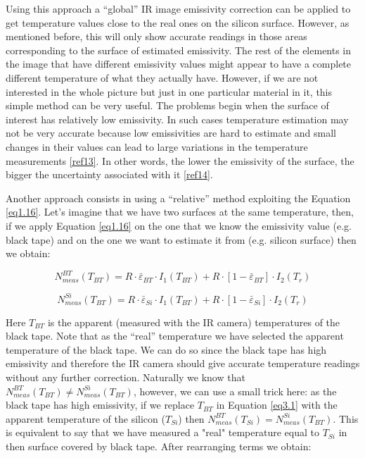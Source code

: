 		Using this approach a “global” IR image emissivity correction can be applied to get temperature values close to the real ones on the silicon surface. However, as mentioned before, this will only show accurate readings in those areas corresponding to the surface of estimated emissivity. The rest of the elements in the image that have different emissivity values might appear to have a complete different temperature of what they actually have. However, if we are not interested in the whole picture but just in one particular material in it, this simple method can be very useful. The problems begin when the surface of interest has relatively low emissivity. In such cases temperature estimation may not be very accurate because low emissivities are hard to estimate and small changes in their values can lead to large variations in the temperature measurements \ref{ref13}. In other words, the lower the emissivity of the surface, the bigger the uncertainty associated with it \ref{ref14}.
		
		Another approach consists in using a “relative” method exploiting the Equation \ref{eq1.16}. Let's imagine that we have two surfaces at the same temperature, then, if we apply Equation \ref{eq1.16} on the one that we know the emissivity value (e.g. black tape) and on the one we want to estimate it from (e.g. silicon surface) then we obtain:
		
		\begin{equation}\label{eq3.1}
			N^{BT}_{meas}(T_{BT})= R \cdot \bar{\varepsilon}_{BT} \cdot I_{1}(T_{BT}) + R \cdot [1- \bar{\varepsilon}_{BT}] \cdot I_{2}(T_{r})
		\end{equation}
			
		\begin{equation}\label{eq3.2}
			N^{Si}_{meas}(T_{BT})= R \cdot \bar{\varepsilon}_{Si} \cdot I_{1}(T_{BT}) + R \cdot [1- \bar{\varepsilon}_{Si}] \cdot I_{2}(T_{r})
		\end{equation}\bigskip
	
		Here $T_{BT}$ is the apparent (measured with the IR camera) temperatures of the black tape. Note that as the “real” temperature we have selected the apparent temperature of the black tape. We can do so since the black tape has high emissivity and therefore the IR camera should give accurate temperature readings without any further correction. Naturally we know that $N^{BT}_{meas}(T_{BT}) \neq N^{Si}_{meas}(T_{BT})$, however, we can use a small trick here: as the black tape has high emissivity, if we replace $T_{BT}$ in Equation \ref{eq3.1} with the apparent temperature of the silicon ($T_{Si}$) then $N^{BT}_{meas}(T_{Si}) = N^{Si}_{meas}(T_{BT})$. This is equivalent to say that we have measured a "real" temperature equal to $T_{Si}$ in then surface covered by black tape. After rearranging terms we obtain:
		
